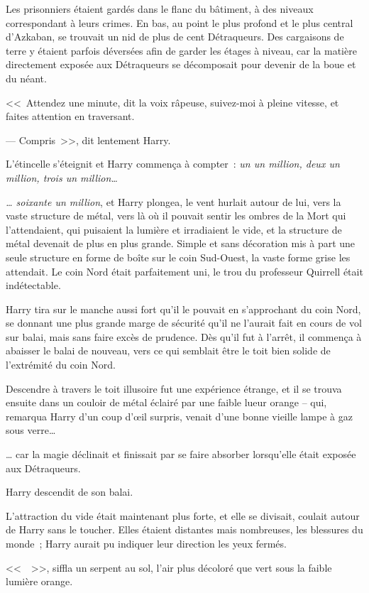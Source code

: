 Les prisonniers étaient gardés dans le flanc du bâtiment, à des niveaux correspondant à leurs crimes. En bas, au point le plus profond et le plus central d'Azkaban, se trouvait un nid de plus de cent Détraqueurs. Des cargaisons de terre y étaient parfois déversées afin de garder les étages à niveau, car la matière directement exposée aux Détraqueurs se décomposait pour devenir de la boue et du néant.

<<~Attendez une minute, dit la voix râpeuse, suivez-moi à pleine vitesse, et faites attention en traversant.

--- Compris~>>, dit lentement Harry.

L'étincelle s'éteignit et Harry commença à compter~: \emph{un un million, deux un million, trois un million…}

\emph{… soixante un million}, et Harry plongea, le vent hurlait autour de lui, vers la vaste structure de métal, vers là où il pouvait sentir les ombres de la Mort qui l'attendaient, qui puisaient la lumière et irradiaient le vide, et la structure de métal devenait de plus en plus grande. Simple et sans décoration mis à part une seule structure en forme de boîte sur le coin Sud-Ouest, la vaste forme grise les attendait. Le coin Nord était parfaitement uni, le trou du professeur Quirrell était indétectable.

Harry tira sur le manche aussi fort qu'il le pouvait en s'approchant du coin Nord, se donnant une plus grande marge de sécurité qu'il ne l'aurait fait en cours de vol sur balai, mais sans faire excès de prudence. Dès qu'il fut à l'arrêt, il commença à abaisser le balai de nouveau, vers ce qui semblait être le toit bien solide de l'extrémité du coin Nord.

Descendre à travers le toit illusoire fut une expérience étrange, et il se trouva ensuite dans un couloir de métal éclairé par une faible lueur orange -- qui, remarqua Harry d'un coup d'œil surpris, venait d'une bonne vieille lampe à gaz sous verre…

… car la magie déclinait et finissait par se faire absorber lorsqu'elle était exposée aux Détraqueurs.

Harry descendit de son balai.

L'attraction du vide était maintenant plus forte, et elle se divisait, coulait autour de Harry sans le toucher. Elles étaient distantes mais nombreuses, les blessures du monde~; Harry aurait pu indiquer leur direction les yeux fermés.

<<~~>>, siffla un serpent au sol, l'air plus décoloré que vert sous la faible lumière orange.

